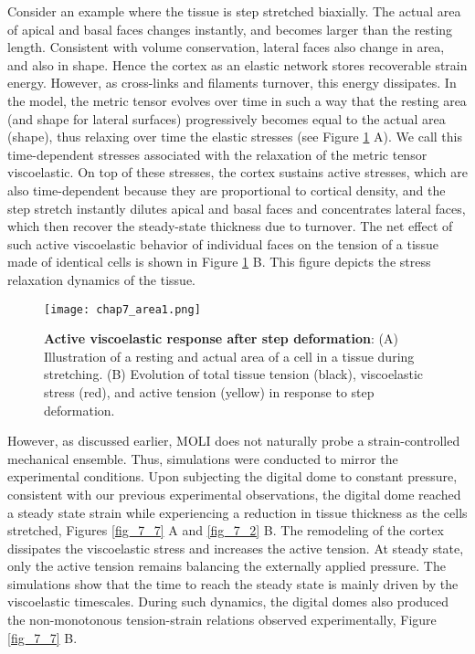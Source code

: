 Consider an example where the tissue is step stretched biaxially. The actual area of apical and basal faces  changes instantly, and becomes larger than the resting length. Consistent with volume conservation, lateral faces also change in area, and also in shape. Hence the cortex as an elastic network stores recoverable strain energy. However, as cross-links and filaments turnover, this energy dissipates. In the model, the metric tensor evolves over time in such a way that the resting area (and shape for lateral surfaces) progressively becomes equal to the actual area (shape), thus relaxing over time the elastic stresses (see Figure \ref{fig_7_7a} A). We call this time-dependent stresses associated with the relaxation of the metric tensor viscoelastic. On top of these stresses, the cortex sustains active stresses, which are also time-dependent because they are proportional to cortical density, and the step stretch instantly dilutes apical and basal faces and concentrates lateral faces, which then recover the steady-state thickness due to turnover. The net effect of such active viscoelastic behavior of individual faces on the tension of a tissue made of identical cells is shown in  Figure \ref{fig_7_7a} B. This figure depicts the stress relaxation dynamics of the tissue.

\begin{figure}[b!]
	\centering
	\texttt{[image: chap7\_area1.png]}
	\caption{\label{fig_7_7a} \textbf{Active viscoelastic response after step deformation}: (A) Illustration of a resting and actual area of a cell in a tissue during stretching. (B) Evolution of total tissue tension (black), viscoelastic stress (red), and active tension (yellow) in response to step deformation.
	}
\end{figure}

However, as discussed earlier, MOLI does not naturally probe a strain-controlled mechanical ensemble. Thus,  simulations were conducted to mirror the experimental conditions. Upon subjecting the digital dome to constant pressure, consistent with our previous experimental observations, the digital dome reached a steady state strain while experiencing a reduction in tissue thickness as the cells stretched, Figures \ref{fig_7_7} A and \ref{fig_7_2} B. The remodeling of the cortex dissipates the viscoelastic stress and increases the active tension. At steady state, only the active tension remains balancing the externally applied pressure. The simulations show that the time to reach the steady state is mainly driven by the viscoelastic timescales. During such dynamics, the digital domes also produced the  non-monotonous tension-strain relations observed experimentally, Figure \ref{fig_7_7} B.

